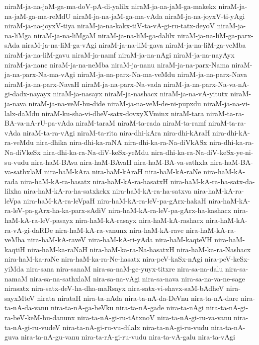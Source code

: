 {niraM-ja-na-jaM-ga-ma-doV-pA-di-yalilx
niraM-ja-na-jaM-ga-makekx
niraM-ja-na-jaM-ga-ma-reMdU
niraM-ja-na-jaM-ga-ma-vAda
niraM-ja-na-joyxV-ti-yAgi
niraM-ja-na-joyxV-tiya
niraM-ja-na-kakx-tiV-ta-vA-gi-ru-tatx-deyoV
niraM-ja-na-liMga
niraM-ja-na-liMgaM
niraM-ja-na-liM-ga-dalilx
niraM-ja-na-liM-ga-parx-sAda
niraM-ja-na-liM-ga-vAgi
niraM-ja-na-liM-gava
niraM-ja-na-liM-ga-veMba
niraM-ja-na-liM-gavu
niraM-ja-namf
niraM-ja-na-nAgi
niraM-ja-na-nayAyx
niraM-ja-nane
niraM-ja-na-neMba
niraM-ja-nanu
niraM-ja-na-parx-Nama
niraM-ja-na-parx-Na-ma-vAgi
niraM-ja-na-parx-Na-ma-veMdu
niraM-ja-na-parx-Nava
niraM-ja-na-parx-NavaH
niraM-ja-na-parx-Na-vada
niraM-ja-na-parx-Na-va-nA-gi-dadx-nayayx
niraM-ja-nasayx
niraM-ja-nashacx
niraM-ja-na-vA-yitutx
niraM-ja-nava
niraM-ja-na-veM-bu-dide
niraM-ja-na-veM-de-ni-pupxdu
niraM-ja-na-vi-lalx-daMdu
niraM-ku-sha-vi-dheV-satx-dovxyXVminx
niraM-tara
niraM-ta-ra-BA-va-nA-rU-pa-vAda
niraM-taraM
niraM-ta-rada
niraM-ta-ramf
niraM-ta-ra-vAda
niraM-ta-ra-vAgi
niraM-ta-rita
nira-dhi-kAra
nira-dhi-kAraH
nira-dhi-kA-ra-veMdu
nira-dhika
nira-dhi-ka-raNA
nira-dhi-ka-ra-Na-diVkASx
nira-dhi-ka-ra-Na-diVkeSx
nira-dhi-ka-ra-Na-diV-keSx-yeMdu
nira-dhi-ka-ra-Na-diV-keSx-ye-ni-su-vudu
nira-haM-BAva
nira-haM-BAvaH
nira-haM-BA-va-sathxla
nira-haM-BA-va-sathxlaM
nira-haM-kAra
nira-haM-kAraH
nira-haM-kA-raNe
nira-haM-kA-rada
nira-haM-kA-ra-hasatx
nira-haM-kA-ra-hasatxH
nira-haM-kA-ra-ha-satx-da-lilxha
nira-haM-kA-ra-ha-satxkekx
nira-haM-kA-ra-ha-satxva
nira-haM-kA-ra-leVpa
nira-haM-kA-ra-leVpaH
nira-haM-kA-ra-leV-pa-gArx-hakaH
nira-haM-kA-ra-leV-pa-gArx-ha-ka-parx-sAdiV
nira-haM-kA-ra-leV-pa-gArx-ha-kashacx
nira-haM-kA-ra-leV-pasayx
nira-haM-kA-rasayx
nira-haM-kA-rashacx
nira-haM-kA-ra-vA-gi-daRDe
nira-haM-kA-ra-vanunx
nira-haM-kA-rave
nira-haM-kA-ra-veMba
nira-haM-kA-raveV
nira-haM-kA-ri-yAda
nira-haM-kaqteVH
nira-haM-kaqtiH
nira-haM-ka-raNaH
nira-haM-ka-ra-Na-hasatxH
nira-haM-ka-ra-Nashacx
nira-haM-ka-raNe
nira-haM-ka-ra-Ne-hasatx
nira-peV-kaSx-nAgi
nira-peV-keSx-yiMda
nira-sana
nira-sanaM
nira-sa-naM-ge-yuyx-titxre
nira-sa-na-dalu
nira-sa-namaM
nira-sa-na-sathxlaM
nira-sa-na-vAgi
nira-sa-nava
nira-sa-na-va-ne-sage
nirasatx
nira-satx-deV-ha-dha-maRsayx
nira-satx-vi-shavx-saM-bAdheV
nira-sayxMteV
nirata
nirataH
nira-ta-nAda
nira-ta-nA-da-DeVnu
nira-ta-nA-dare
nira-ta-nA-da-vanu
nira-ta-nA-ga-beVku
nira-ta-nA-gade
nira-ta-nAgi
nira-ta-nA-gi-ra-beV-keM-bu-danunx
nira-ta-nA-gi-ru-tAtxnoV
nira-ta-nA-gi-ru-va-vanu
nira-ta-nA-gi-ru-vudeV
nira-ta-nA-gi-ru-vu-dilalx
nira-ta-nA-gi-ru-vudu
nira-ta-nA-guva
nira-ta-nA-gu-vanu
nira-ta-rA-gi-ru-vudu
nira-ta-vA-galu
nira-ta-vAgi
}
